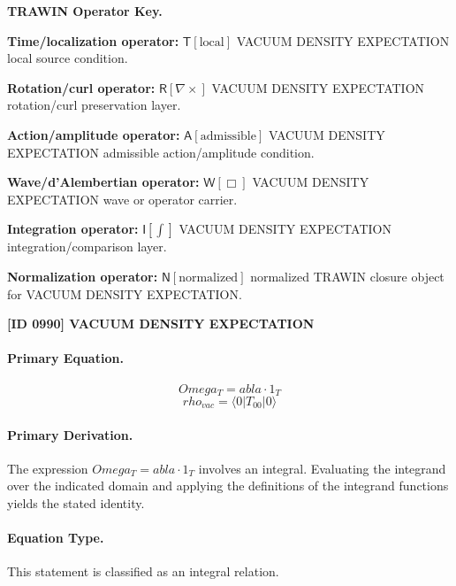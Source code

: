 \par\vspace{0.45\baselineskip}
\noindent\begin{minipage}[t]{\linewidth}
\begingroup
\small
\raggedright
\textbf{TRAWIN Operator Key.}\par
\noindent\textbf{Time/localization operator:} $\mathsf{T}\!\left[\mathrm{local}\right]$ VACUUM DENSITY EXPECTATION local source condition.\par
\noindent\textbf{Rotation/curl operator:} $\mathsf{R}\!\left[\nabla\times\right]$ VACUUM DENSITY EXPECTATION rotation/curl preservation layer.\par
\noindent\textbf{Action/amplitude operator:} $\mathsf{A}\!\left[\mathrm{admissible}\right]$ VACUUM DENSITY EXPECTATION admissible action/amplitude condition.\par
\noindent\textbf{Wave/d'Alembertian operator:} $\mathsf{W}\!\left[\Box\right]$ VACUUM DENSITY EXPECTATION wave or operator carrier.\par
\noindent\textbf{Integration operator:} $\mathsf{I}\!\left[\int\right]$ VACUUM DENSITY EXPECTATION integration/comparison layer.\par
\noindent\textbf{Normalization operator:} $\mathsf{N}\!\left[\mathrm{normalized}\right]$ normalized TRAWIN closure object for VACUUM DENSITY EXPECTATION.\par
\endgroup
\end{minipage}

\clearpage
\noindent\textbf{[ID 0990] VACUUM DENSITY EXPECTATION}\par
\vspace{0.35em}
\paragraph{Primary Equation.}
\[
Omega_T =  abla \cdot 1_T
\]
\[
rho_{vac} = \langle 0 | T_{00} | 0 \rangle
\]

\paragraph{Primary Derivation.}
The expression \( Omega_T = abla \cdot 1_T \) involves an integral. Evaluating the integrand over the indicated domain and applying the definitions of the integrand functions yields the stated identity.
\paragraph{Equation Type.}
This statement is classified as an integral relation.

